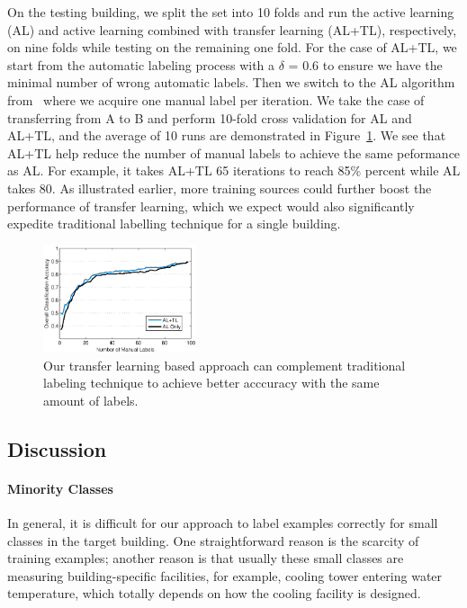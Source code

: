On the testing building, we split the set into 10 folds and run the active learning (AL) and active learning combined with transfer learning (AL+TL), respectively, on nine folds while testing on the remaining one fold.
For the case of AL+TL, we start from the automatic labeling process with a $\delta$ = 0.6 to ensure we have the minimal number of wrong automatic labels. Then we switch to the AL algorithm from~\cite{cikm} where we acquire one manual label per iteration.
We take the case of transferring from A to B and perform 10-fold cross validation for AL and AL+TL, and the average of 10 runs are demonstrated in Figure~\ref{fig:comp}. 
We see that AL+TL help reduce the number of manual labels to achieve the same peformance as AL.
For example, it takes AL+TL 65 iterations to reach 85\% percent while AL takes 80.
As illustrated earlier, more training sources could further boost the performance of transfer learning, which we expect would also significantly expedite traditional labelling technique for a single building.

\begin{figure}[t]
\centering
\includegraphics[width=0.4\textwidth]{./fig/tl_al.eps}
\caption{Our transfer learning based approach can complement traditional labeling technique to achieve better acccuracy with the same amount of labels.}
\label{fig:comp}
\end{figure}


\subsection{Discussion}
\paragraph{Minority Classes} In general, it is difficult for our approach to label examples correctly for small classes in the target building. One straightforward reason is the scarcity of training examples; another reason is that usually these small classes are measuring building-specific facilities, for example, cooling tower entering water temperature, which totally depends on how the cooling facility is designed.

